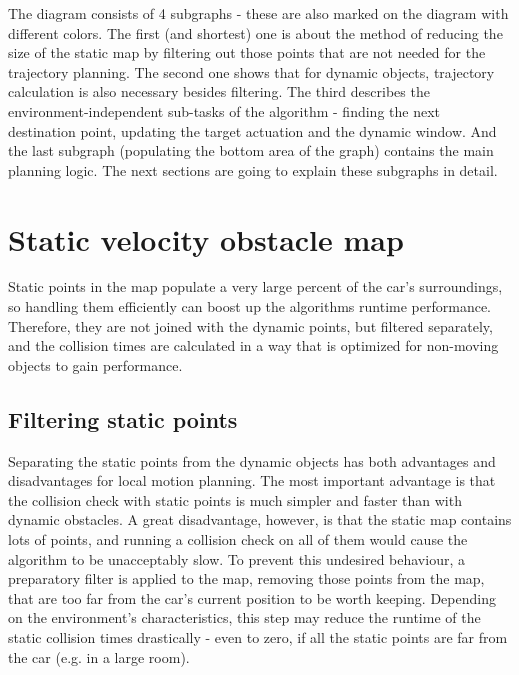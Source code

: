 The diagram consists of 4 subgraphs - these are also marked on the diagram with different colors. The first (and shortest) one is about the method of reducing the size of the static map by filtering out those points that are not needed for the trajectory planning. The second one shows that for dynamic objects, trajectory calculation is also necessary besides filtering. The third describes the environment-independent sub-tasks of the algorithm - finding the next destination point, updating the target actuation and the dynamic window. And the last subgraph (populating the bottom area of the graph) contains the main planning logic. The next sections are going to explain these subgraphs in detail.

\section{Static velocity obstacle map}
\label{chap:static_velocity_obstacle_map}
Static points in the map populate a very large percent of the car's surroundings, so handling them efficiently can boost up the algorithms runtime performance. Therefore, they are not joined with the dynamic points, but filtered separately, and the collision times are calculated in a way that is optimized for non-moving objects to gain performance.

\subsection{Filtering static points}
Separating the static points from the dynamic objects has both advantages and disadvantages for local motion planning. The most important advantage is that the collision check with static points is much simpler and faster than with dynamic obstacles. A great disadvantage, however, is that the static map contains lots of points, and running a collision check on all of them would cause the algorithm to be unacceptably slow. To prevent this undesired behaviour, a preparatory filter is applied to the map, removing those points from the map, that are too far from the car's current position to be worth keeping. Depending on the environment's characteristics, this step may reduce the runtime of the static collision times drastically - even to zero, if all the static points are far from the car (e.g. in a large room).

